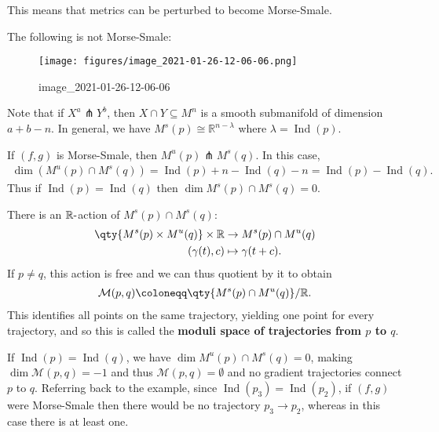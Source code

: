 \begin{remark}

This means that metrics can be perturbed to become Morse-Smale.

\end{remark}

\begin{example}[?]

The following is not Morse-Smale:

\begin{figure}
\centering
\texttt{[image: figures/image\_2021-01-26-12-06-06.png]}
\caption{image\_2021-01-26-12-06-06}
\end{figure}

Note that if \(X^a \pitchfork Y^b\), then \(X \cap Y \subseteq M^n\) is
a smooth submanifold of dimension \(a+b-n\). In general, we have
\(M^s(p) \cong {\mathbb{R}}^{n - \lambda}\) where
\(\lambda = \mathop{\mathrm{Ind}}(p)\).

\begin{observation}

If \((f, g)\) is Morse-Smale, then \(M^u(p) \pitchfork M^s(q)\). In this
case,
\begin{align*}
\dim(M^u(p) \cap M^s(q)) = \mathop{\mathrm{Ind}}(p) + n - \mathop{\mathrm{Ind}}(q) - n = \mathop{\mathrm{Ind}}(p) - \mathop{\mathrm{Ind}}(q)
.\end{align*}
Thus if \(\mathop{\mathrm{Ind}}(p) = \mathop{\mathrm{Ind}}(q)\) then
\(\dim M^s(p) \cap M^s(q) = 0\).

\end{observation}

\begin{remark}

There is an \({\mathbb{R}}{\hbox{-}}\)action of \(M^s(p) \cap M^s(q)\):
\begin{align*}
\qty{ M^s(p) \times M^u(q) } \times{\mathbb{R}}&\to M^s(p) \cap M^u(q) \\
( \gamma(t), c) &\mapsto \gamma(t+c)
.\end{align*}
If \(p\neq q\), this action is free and we can thus quotient by it to
obtain
\begin{align*}
\mathcal{M}(p, q) \coloneqq\qty{ M^s(p) \cap M^u(q)} / {\mathbb{R}}
.\end{align*}
This identifies all points on the same trajectory, yielding one point
for every trajectory, and so this is called the \textbf{moduli space of
trajectories from \(p\) to \(q\)}.

\end{remark}

If \(\mathop{\mathrm{Ind}}(p) = \mathop{\mathrm{Ind}}(q)\), we have
\(\dim M^u(p) \cap M^s (q) = 0\), making \(\dim \mathcal{M}(p, q) = -1\)
and thus \(\mathcal{M}(p, q) = \emptyset\) and no gradient trajectories
connect \(p\) to \(q\). Referring back to the example, since
\(\mathop{\mathrm{Ind}}(p_3) = \mathop{\mathrm{Ind}}(p_2)\), if
\((f, g)\) were Morse-Smale then there would be no trajectory
\(p_3 \to p_2\), whereas in this case there is at least one.

\end{example}

